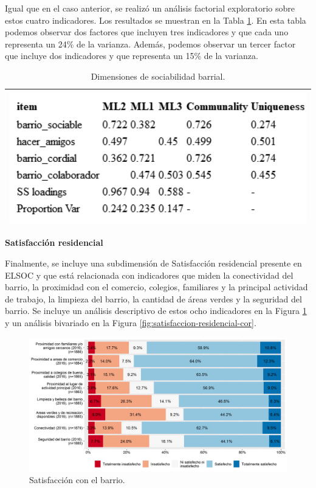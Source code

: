 \documentclass[
  12pt,
]{book}
\begin{document}
Igual que en el caso anterior, se realizó un análisis factorial exploratorio sobre estos cuatro indicadores. Los resultados se muestran en la Tabla \ref{tab:sociabilidad-barrial-fa}. En esta tabla podemos observar dos factores que incluyen tres indicadores y que cada uno representa un 24\% de la varianza. Además, podemos observar un tercer factor que incluye dos indicadores y que representa un 15\% de la varianza.

\begin{longtable}[]{@{}l@{}}
\caption{\label{tab:sociabilidad-barrial-fa}Dimensiones de sociabilidad barrial.}\tabularnewline
\toprule
\endhead
\includegraphics[width=5.20833in,height=\textheight]{output/tables/sociabilidad_barrial_fa.png} \\
\bottomrule
\end{longtable}

\textbf{Satisfacción residencial}

Finalmente, se incluye una subdimensión de Satisfacción residencial presente en ELSOC y que está relacionada con indicadores que miden la conectividad del barrio, la proximidad con el comercio, colegios, familiares y la principal actividad de trabajo, la limpieza del barrio, la cantidad de áreas verdes y la seguridad del barrio. Se incluye un análisis descriptivo de estos ocho indicadores en la Figura \ref{fig:satisfaccion-residencial} y un análisis bivariado en la Figura \ref{fig:satisfaccion-residencial-cor}.

\begin{figure}[H]

{\centering \includegraphics[width=1\linewidth,height=1\textheight]{output/graphs/satisfaccion-residencial} 

}

\caption{Satisfacción con el barrio.}\label{fig:satisfaccion-residencial}
\end{figure}
\end{document}
